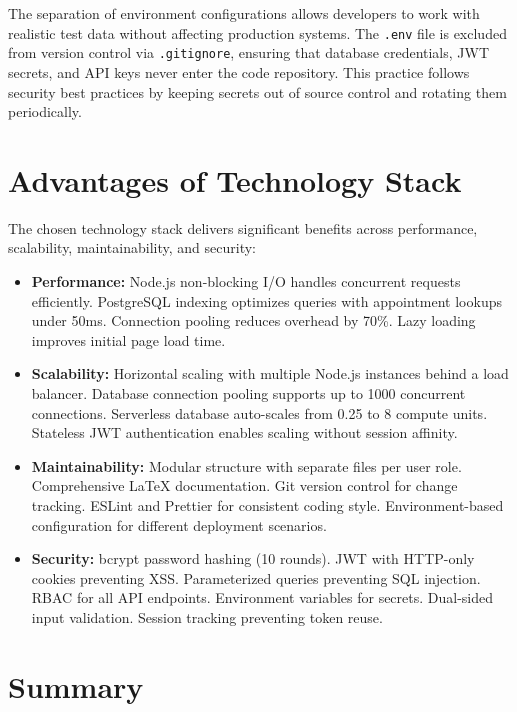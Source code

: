 \justifying
\noindent The separation of environment configurations allows developers to work with realistic test data without affecting production systems. The \texttt{.env} file is excluded from version control via \texttt{.gitignore}, ensuring that database credentials, JWT secrets, and API keys never enter the code repository. This practice follows security best practices by keeping secrets out of source control and rotating them periodically.

\section{Advantages of Technology Stack}

\justifying
\noindent The chosen technology stack delivers significant benefits across performance, scalability, maintainability, and security:

\begin{itemize}
    \item \textbf{Performance:} Node.js non-blocking I/O handles concurrent requests efficiently. PostgreSQL indexing optimizes queries with appointment lookups under 50ms. Connection pooling reduces overhead by 70\%. Lazy loading improves initial page load time.

    \item \textbf{Scalability:} Horizontal scaling with multiple Node.js instances behind a load balancer. Database connection pooling supports up to 1000 concurrent connections. Serverless database auto-scales from 0.25 to 8 compute units. Stateless JWT authentication enables scaling without session affinity.

    \item \textbf{Maintainability:} Modular structure with separate files per user role. Comprehensive LaTeX documentation. Git version control for change tracking. ESLint and Prettier for consistent coding style. Environment-based configuration for different deployment scenarios.

    \item \textbf{Security:} bcrypt password hashing (10 rounds). JWT with HTTP-only cookies preventing XSS. Parameterized queries preventing SQL injection. RBAC for all API endpoints. Environment variables for secrets. Dual-sided input validation. Session tracking preventing token reuse.
\end{itemize}

\section{Summary}

